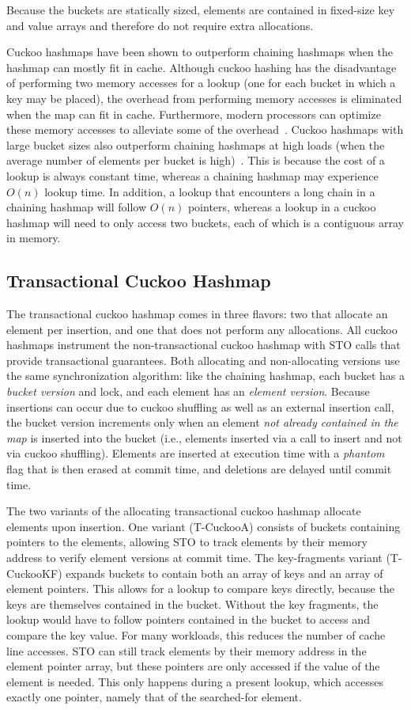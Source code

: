 Because the buckets are statically sized, elements are contained in fixed-size key and value arrays and therefore do not require extra allocations.

Cuckoo hashmaps have been shown to outperform chaining hashmaps when the hashmap can mostly fit in cache. Although cuckoo hashing has the disadvantage of performing two memory accesses for a lookup (one for each bucket in which a key may be placed), the overhead from performing memory accesses is eliminated when the map can fit in cache.
Furthermore, modern processors can optimize these memory accesses to alleviate some of the overhead~\cite{chm_arch}.
Cuckoo hashmaps with large bucket sizes also outperform chaining hashmaps at high loads (when the average number of elements per bucket is high)~\cite{chm_load}. This is because the cost of a lookup is always constant time, whereas a chaining hashmap may experience $O(n)$ lookup time. In addition, a lookup that encounters a long chain in a chaining hashmap will follow $O(n)$ pointers, whereas a lookup in a cuckoo hashmap will need to only access two buckets, each of which is a contiguous array in memory.

\subsection{Transactional Cuckoo Hashmap}
The transactional cuckoo hashmap comes in three flavors: two that allocate an element per insertion, and one that does not perform any allocations. All cuckoo hashmaps instrument the non-transactional cuckoo hashmap with STO calls that provide transactional guarantees.
Both allocating and non-allocating versions use the same synchronization algorithm: like the chaining hashmap, each bucket has a \emph{bucket version} and lock, and each element has an \emph{element version}. Because insertions can occur due to cuckoo shuffling as well as an external insertion call, the bucket version increments only when an element \emph{not already contained in the map} is inserted into the bucket (i.e., elements inserted via a call to insert and not via cuckoo shuffling). Elements are inserted at execution time with a \emph{phantom} flag that is then erased at commit time, and deletions are delayed until commit time.

The two variants of the allocating transactional cuckoo hashmap allocate elements upon insertion. One variant (T-CuckooA) consists of buckets containing pointers to the elements, allowing STO to track elements by their memory address to verify element versions at commit time. The key-fragments variant (T-CuckooKF) expands buckets to contain both an array of keys and an array of element pointers. This allows for a lookup to compare keys directly, because the keys are themselves contained in the bucket. Without the key fragments, the lookup would have to follow pointers contained in the bucket to access and compare the key value. For many workloads, this reduces the number of cache line accesses. STO can still track elements by their memory address in the element pointer array, but these pointers are only accessed if the value of the element is needed. This only happens during a present lookup, which accesses exactly one pointer, namely that of the searched-for element.

